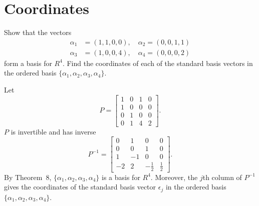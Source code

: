 \section{Coordinates}

 Show that the vectors
\begin{align*}
  \alpha_1 &= (1, 1, 0, 0), \quad \alpha_2 = (0, 0, 1, 1) \\
  \alpha_3 &= (1, 0, 0, 4), \quad \alpha_4 = (0, 0, 0, 2)
\end{align*}
form a basis for $R^4$. Find the coordinates of each of the standard
basis vectors in the ordered basis
$\{\alpha_1, \alpha_2, \alpha_3, \alpha_4\}$.
\begin{solution}
  Let
  \begin{equation*}
    P =
    \begin{bmatrix}
      1 & 0 & 1 & 0 \\
      1 & 0 & 0 & 0 \\
      0 & 1 & 0 & 0 \\
      0 & 1 & 4 & 2
    \end{bmatrix}.
  \end{equation*}
  $P$ is invertible and has inverse
  \begin{equation*}
    P^{-1} =
    \begin{bmatrix}
      0 & 1 & 0 & 0 \\
      0 & 0 & 1 & 0 \\
      1 & -1 & 0 & 0 \\
      -2 & 2 & -\frac12 & \frac12
    \end{bmatrix}.
  \end{equation*}
  By Theorem~8, $\{\alpha_1, \alpha_2, \alpha_3, \alpha_4\}$ is a
  basis for $R^4$. Moreover, the $j$th column of $P^{-1}$ gives the
  coordinates of the standard basis vector $\epsilon_j$ in the ordered
  basis $\{\alpha_1, \alpha_2, \alpha_3, \alpha_4\}$.
\end{solution}
